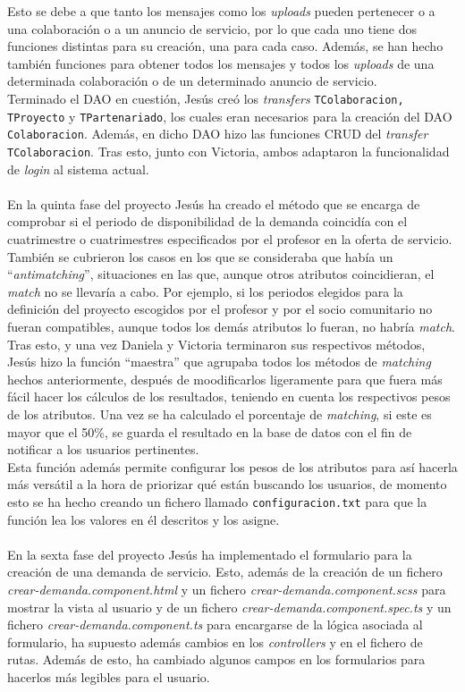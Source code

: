 \documentclass[11pt]{book}
\begin{document}
	Esto se debe a que tanto los mensajes como los \emph{uploads} pueden pertenecer o a una colaboración o a un anuncio de servicio, por lo que cada uno tiene dos funciones distintas para su creación, una para cada caso. Además, se han hecho también funciones para obtener todos los mensajes y todos los \emph{uploads} de una determinada colaboración o de un determinado anuncio de servicio.\\
	Terminado el DAO en cuestión, Jesús creó los \emph{transfers} \texttt{TColaboracion, TProyecto} y \texttt{TPartenariado}, los cuales eran necesarios para la creación del DAO \texttt{Colaboracion}. Además, en dicho DAO hizo las funciones CRUD del \emph{transfer} \texttt{TColaboracion}. Tras esto, junto con Victoria, ambos adaptaron la funcionalidad de \textit{login} al sistema actual.\\\\
	En la quinta fase del proyecto Jesús ha creado el método que se encarga de comprobar si el periodo de disponibilidad de la demanda coincidía con el cuatrimestre o cuatrimestres especificados por el profesor en la oferta de servicio. También se cubrieron los casos en los que se consideraba que había un ``\emph{antimatching}'', situaciones en las que, aunque otros atributos coincidieran, el \textit{match} no se llevaría a cabo. Por ejemplo, si los periodos elegidos para la definición del proyecto escogidos por el profesor y por el socio comunitario no fueran compatibles, aunque todos los demás atributos lo fueran, no habría \emph{match}.\\
	Tras esto, y una vez Daniela y Victoria terminaron sus respectivos métodos, Jesús hizo la función ``maestra'' que agrupaba todos los métodos de \emph{matching} hechos anteriormente, después de moodificarlos ligeramente para que fuera más fácil hacer los cálculos de los resultados, teniendo en cuenta los respectivos pesos de los atributos. Una vez se ha calculado el porcentaje de \emph{matching}, si este es mayor que el 50\%, se guarda el resultado en la base de datos con el fin de notificar a los usuarios pertinentes.\\
	Esta función además permite configurar los pesos de los atributos para así hacerla más versátil a la hora de priorizar qué están buscando los usuarios, de momento esto se ha hecho creando un fichero llamado \texttt{configuracion.txt} para que la función lea los valores en él descritos y los asigne.\\\\
	En la sexta fase del proyecto Jesús ha implementado el formulario para la creación de una demanda de servicio. Esto, además de la creación de un fichero \textit{crear-demanda.component.html} y un fichero \textit{crear-demanda.component.scss} para mostrar la vista al usuario  y de un fichero \textit{crear-demanda.component.spec.ts}
	y un fichero \textit{crear-demanda.component.ts} para encargarse de la lógica asociada al formulario, ha supuesto además cambios en los \emph{controllers} y en el fichero de rutas. Además de esto, ha cambiado algunos campos en los formularios para hacerlos más legibles para el usuario.
	
\end{document}
